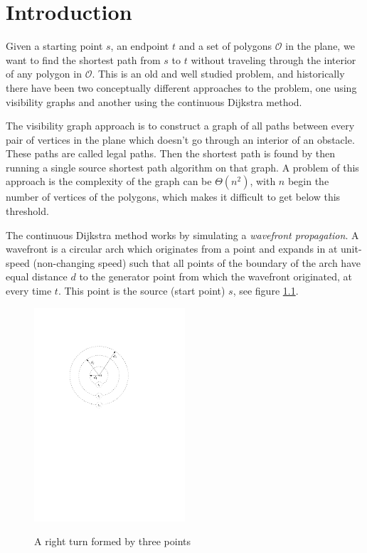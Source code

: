 \chapter{Introduction} Given a starting point $s$, an endpoint $t$ and a set of
polygons $\mathcal{O}$ in the plane, we want to find the shortest path from $s$ to $t$ 
without traveling through the interior of any polygon in $\mathcal{O}$. 
This is an old and well studied problem, and historically there have been two
conceptually different approaches to the problem, one using visibility graphs and
another using the continuous Dijkstra method. 

The visibility graph approach is to construct a graph of all paths between every pair 
of vertices in the plane which doesn't go through an interior of an obstacle. 
These paths are called legal paths. Then the shortest path is found by then running a 
single source shortest path algorithm on that graph. A problem of this approach
is the complexity of the graph can be $\Theta(n^2)$, with $n$ begin the number of vertices of the polygons,
which makes it difficult to get below this threshold. 

The continuous Dijkstra method works by simulating a \emph{wavefront propagation}.
A wavefront is a circular arch which originates from a point and expands in at unit-speed
(non-changing speed) such that all points of the boundary of the arch have equal distance 
$d$ to the generator point from which the wavefront originated, at every time $t$. 
This point is the source (start point) $s$, see figure \ref{fig:simplewavefront}.

\begin{figure}[H]
    \centering
	\includegraphics[width=0.5\textwidth]{figures/simplewavefront.pdf}
	\label{fig:simplewavefront}
	\caption{A right turn formed by three points}
\end{figure}

